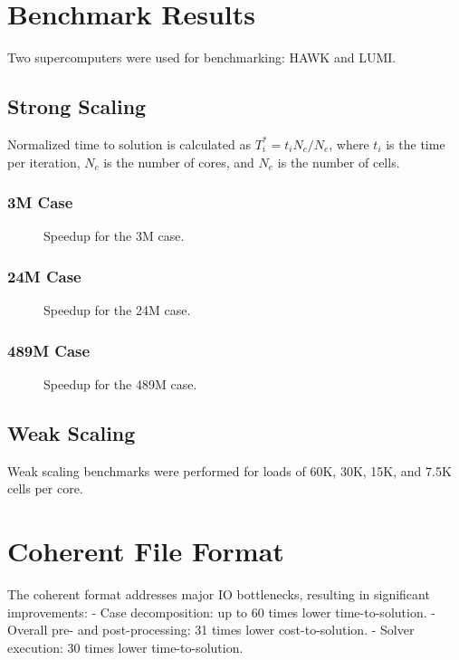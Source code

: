 \section*{Benchmark Results}
Two supercomputers were used for benchmarking: HAWK and LUMI.

\subsection*{Strong Scaling}
Normalized time to solution is calculated as $T_i^* = t_i N_c / N_e$, where $t_i$ is the time per iteration, $N_c$ is the number of cores, and $N_e$ is the number of cells.

\subsubsection*{3M Case}
\begin{figure}[h]
    \centering
    \caption{Speedup for the 3M case.}
\end{figure}

\subsubsection*{24M Case}
\begin{figure}[h]
    \centering
    \caption{Speedup for the 24M case.}
\end{figure}

\subsubsection*{489M Case}
\begin{figure}[h]
    \centering
    \caption{Speedup for the 489M case.}
\end{figure}

\subsection*{Weak Scaling}
Weak scaling benchmarks were performed for loads of 60K, 30K, 15K, and 7.5K cells per core.

\section*{Coherent File Format}
The coherent format addresses major IO bottlenecks, resulting in significant improvements:
- Case decomposition: up to 60 times lower time-to-solution.
- Overall pre- and post-processing: 31 times lower cost-to-solution.
- Solver execution: 30 times lower time-to-solution.